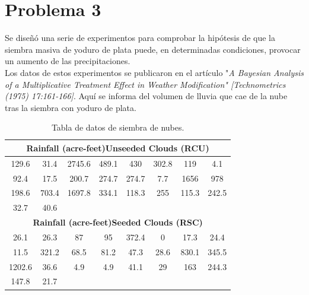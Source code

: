 \documentclass[a4paper,12pt]{article}
\newcommand{\head}[1]{\textnormal{\textbf{#1}}} %
\begin{document}
\section *{Problema 3}
Se diseñó una serie de experimentos para comprobar la hipótesis de que la siembra masiva de yoduro de plata puede, en determinadas condiciones, provocar un aumento de las precipitaciones. \\
Los datos de estos experimentos se publicaron en el artículo "\textit{A Bayesian Analysis of a Multiplicative Treatment Effect in Weather Modification" [Technometrics (1975) 17:161-166]}. Aquí se informa del volumen de lluvia que cae de la nube tras la siembra con yoduro de plata.
	\begin{table}[H]
		\centering
		\caption{Tabla de datos de siembra de nubes.}
		\begin{tabular}{cccccccc}
			\toprule[1.5 pt]
			\multicolumn{8}{c}{\head{Rainfall (acre-feet)Unseeded Clouds (RCU)}} \\
			\midrule
			129.6&31.4&2745.6&489.1&430&302.8&119&4.1\\
			92.4&17.5&200.7&274.7&274.7&7.7&1656&978\\
			198.6&703.4&1697.8&334.1&118.3&255&115.3&242.5\\
			32.7&40.6&&&&&&\\
			\midrule
			\multicolumn{8}{c}{\head{Rainfall (acre-feet)Seeded Clouds (RSC)}} \\
			\midrule
			26.1&26.3&87&95&372.4&0&17.3&24.4\\
			11.5&321.2&68.5&81.2&47.3&28.6&830.1&345.5\\
			1202.6&36.6&4.9&4.9&41.1&29&163&244.3\\
			147.8&21.7&&&&&&\\
			\bottomrule[1.5pt]
		\end{tabular}
		\label{tab:my_label3}
\end{table}
\end{document}

